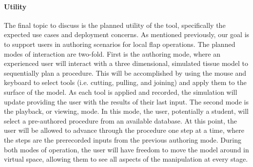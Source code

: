 


\paragraph{Utility} 

The final topic to discuss is the planned utility of the tool,
specifically the expected use cases and deployment concerns. As
mentioned previously, our goal is to support users in authoring scenarios for
local flap operations. The planned modes of interaction are
two-fold. First is the authoring mode, where an experienced user will
interact with a three dimensional, simulated tissue model to sequentially
plan a procedure. This will be accomplished by using the mouse and
keyboard to select tools (i.e. cutting, pulling, and joining) and apply
them to the surface of the model. As each tool is applied and recorded, the
simulation will update providing the user with the results of their
last input. The second mode is the playback, or viewing, mode. In this
mode, the user, potentially a student, will select a pre-authored
procedure from an available database. At this point, the user will be
allowed to advance through the procedure one step at a time, where the
steps are the prerecorded inputs from the previous authoring
mode. During both modes of operation, the user will have freedom to move the
model around in virtual space, allowing them to see all aspects of the
manipulation at every stage.

